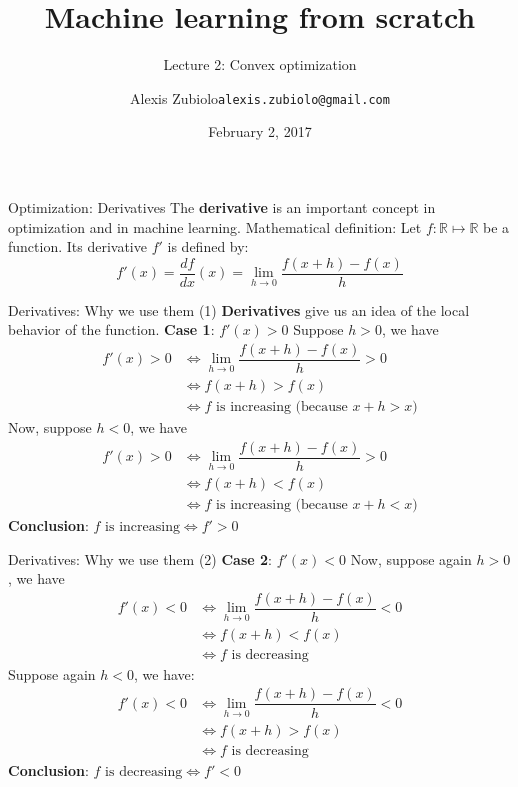 \documentclass{beamer}
\title[Course presentation]{Machine learning from scratch}
\subtitle{Lecture 2: Convex optimization}
\author{Alexis Zubiolo\newline\texttt{alexis.zubiolo@gmail.com}}
\institute{Data Science Team Lead @ Adcash}
\date{February 2, 2017}
\newcommand{\real}{\mathbb{R}}
\newcommand{\1}[1]{\mathbbm{1}\left[#1\right]}
\begin{document}
\begin{frame}
  \titlepage
\end{frame}
\begin{frame}{Optimization: Derivatives}
The \textbf{derivative} is an important concept in optimization and in machine learning. Mathematical definition: Let $f : \real \mapsto \real$ be a function. Its derivative $f'$ is defined by:
\begin{equation*}
	f'(x) = \dfrac{df}{dx}(x) = \lim_{h \to 0}\dfrac{f(x + h) - f(x)}{h}
\end{equation*}
\end{frame}

\begin{frame}{Derivatives: Why we use them (1)}
\textbf{Derivatives} give us an idea of the local behavior of the function.
\vfill
\pause
\textbf{Case 1}: $f'(x) > 0$
\vfill
\pause
Suppose $h > 0$, we have
\begin{equation*}
\begin{split}
f'(x) > 0 & \iff \lim_{h \to 0}\dfrac{f(x + h) - f(x)}{h} > 0 \\
& \iff f(x + h) > f(x) \\
& \iff f \text{ is increasing (because } x + h > x \text{)}
\end{split}
\end{equation*}
\vfill
\pause
Now, suppose $h < 0$, we have
\vfill
\pause
\begin{equation*}
\begin{split}
f'(x) > 0 & \iff \lim_{h \to 0}\dfrac{f(x + h) - f(x)}{h} > 0 \\
& \iff f(x + h) < f(x) \\
& \iff f \text{ is increasing (because } x + h < x \text{)}
\end{split}
\end{equation*}
\vfill
\pause
\textbf{Conclusion}: $f \text{ is increasing} \iff f' > 0$
\end{frame}

\begin{frame}{Derivatives: Why we use them (2)}
\textbf{Case 2}: $f'(x) < 0$
\vfill
\pause
Now, suppose again $h > 0$, we have
\vfill
\pause
\begin{equation*}
\begin{split}
f'(x) < 0 & \iff \lim_{h \to 0}\dfrac{f(x + h) - f(x)}{h} < 0 \\
& \iff f(x + h) < f(x) \\
& \iff f \text{ is decreasing}
\end{split}
\end{equation*}
\pause
\vfill
\pause
Suppose again $h < 0$, we have:
\vfill
\pause
\begin{equation*}
\begin{split}
f'(x) < 0 & \iff \lim_{h \to 0}\dfrac{f(x + h) - f(x)}{h} < 0 \\
& \iff f(x + h) > f(x) \\
& \iff f \text{ is decreasing}
\end{split}
\end{equation*}
\vfill
\pause
\textbf{Conclusion}: $f \text{ is decreasing} \iff f' < 0$
\end{frame}
\end{document}
